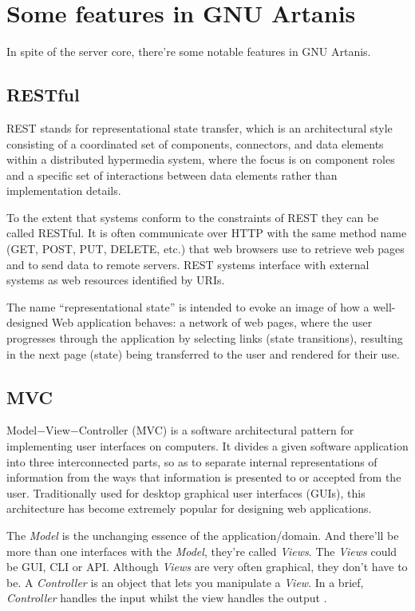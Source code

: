 \documentclass[numbers,numberedpars]{sigplanconf}
\begin{document}
\section{Some features in GNU Artanis} \label{Some features in GNU Artanis}

In spite of the server core, there're some notable features in GNU Artanis.

\subsection{RESTful}

REST stands for representational state transfer, which is an architectural style consisting of a coordinated set of components, connectors,
and data elements within a distributed hypermedia system, where the focus is on component roles and a specific set of interactions between data
elements rather than implementation details.

To the extent that systems conform to the constraints of REST they can be called RESTful. It is often communicate over HTTP with the same method
name (GET, POST, PUT, DELETE, etc.) that web browsers use to retrieve web pages and to send data to remote servers.
REST systems interface with external systems as web resources identified by URIs.

The name ``representational state'' is intended to evoke an image of how a well-designed Web application behaves: a network of web pages,
where the user progresses through the application by selecting links (state transitions), resulting in the next page (state) being transferred to
the user and rendered for their use.



\subsection{MVC}

Model$-$View$-$Controller (MVC) is a software architectural pattern for implementing user interfaces on computers. It divides a given software
application into three interconnected parts, so as to separate internal representations of information from the ways that information is
presented to or accepted from the user. Traditionally used for desktop graphical user interfaces (GUIs), this architecture has become extremely
popular for designing web applications.

The {\it Model} is the unchanging essence of the application/domain. And there'll be more than one interfaces with the {\it Model}, they're called
{\it Views}. The {\it Views} could be GUI, CLI or API. Although {\it Views} are very often graphical, they don’t have to be.
A {\it Controller} is an object that lets you manipulate a {\it View}. In a brief, {\it Controller} handles the input whilst the view handles the
output \citep{deacon2009model}.
\end{document}
